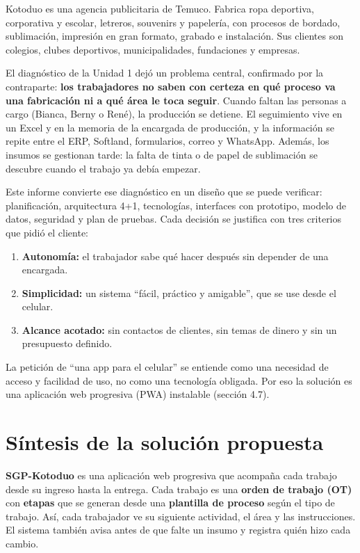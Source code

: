 \documentclass[11pt,a4paper]{article}
\begin{document}
Kotoduo es una agencia publicitaria de Temuco. Fabrica ropa deportiva, corporativa y escolar, letreros, souvenirs y papelería, con procesos de bordado, sublimación, impresión en gran formato, grabado e instalación. Sus clientes son colegios, clubes deportivos, municipalidades, fundaciones y empresas.

El diagnóstico de la Unidad 1 dejó un problema central, confirmado por la contraparte: \textbf{los trabajadores no saben con certeza en qué proceso va una fabricación ni a qué área le toca seguir}. Cuando faltan las personas a cargo (Bianca, Berny o René), la producción se detiene. El seguimiento vive en un Excel y en la memoria de la encargada de producción, y la información se repite entre el ERP, Softland, formularios, correo y WhatsApp. Además, los insumos se gestionan tarde: la falta de tinta o de papel de sublimación se descubre cuando el trabajo ya debía empezar.

Este informe convierte ese diagnóstico en un diseño que se puede verificar: planificación, arquitectura 4+1, tecnologías, interfaces con prototipo, modelo de datos, seguridad y plan de pruebas. Cada decisión se justifica con tres criterios que pidió el cliente:

\begin{enumerate}
\item \textbf{Autonomía:} el trabajador sabe qué hacer después sin depender de una encargada.
\item \textbf{Simplicidad:} un sistema ``fácil, práctico y amigable'', que se use desde el celular.
\item \textbf{Alcance acotado:} sin contactos de clientes, sin temas de dinero y sin un presupuesto definido.
\end{enumerate}

La petición de ``una app para el celular'' se entiende como una necesidad de acceso y facilidad de uso, no como una tecnología obligada. Por eso la solución es una aplicación web progresiva (PWA) instalable (sección 4.7).

\newpage
\section{Síntesis de la solución propuesta}

\textbf{SGP-Kotoduo} es una aplicación web progresiva que acompaña cada trabajo desde su ingreso hasta la entrega. Cada trabajo es una \textbf{orden de trabajo (OT)} con \textbf{etapas} que se generan desde una \textbf{plantilla de proceso} según el tipo de trabajo. Así, cada trabajador ve su siguiente actividad, el área y las instrucciones. El sistema también avisa antes de que falte un insumo y registra quién hizo cada cambio.
\end{document}
